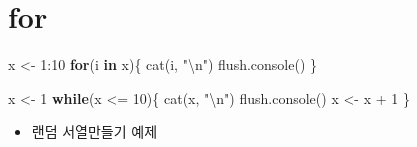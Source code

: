 \documentclass[
]{book}
\newenvironment{Shaded}{\begin{snugshade}}{\end{snugshade}}
\newcommand{\ControlFlowTok}[1]{\textcolor[rgb]{0.13,0.29,0.53}{\textbf{#1}}}
\newcommand{\DecValTok}[1]{\textcolor[rgb]{0.00,0.00,0.81}{#1}}
\newcommand{\FunctionTok}[1]{\textcolor[rgb]{0.00,0.00,0.00}{#1}}
\newcommand{\NormalTok}[1]{#1}
\newcommand{\OtherTok}[1]{\textcolor[rgb]{0.56,0.35,0.01}{#1}}
\newcommand{\SpecialCharTok}[1]{\textcolor[rgb]{0.00,0.00,0.00}{#1}}
\newcommand{\StringTok}[1]{\textcolor[rgb]{0.31,0.60,0.02}{#1}}
\providecommand{\tightlist}{%
  \setlength{\itemsep}{0pt}\setlength{\parskip}{0pt}}
\begin{document}
\hypertarget{for}{%
\section{for}\label{for}}

\begin{Shaded}
\begin{Highlighting}[]
\NormalTok{x }\OtherTok{\textless{}{-}} \DecValTok{1}\SpecialCharTok{:}\DecValTok{10}
\ControlFlowTok{for}\NormalTok{(i }\ControlFlowTok{in}\NormalTok{ x)\{}
  \FunctionTok{cat}\NormalTok{(i, }\StringTok{"}\SpecialCharTok{\textbackslash{}n}\StringTok{"}\NormalTok{)}
  \FunctionTok{flush.console}\NormalTok{()}
\NormalTok{\}}
\end{Highlighting}
\end{Shaded}

\begin{Shaded}
\begin{Highlighting}[]
\NormalTok{x }\OtherTok{\textless{}{-}} \DecValTok{1}
\ControlFlowTok{while}\NormalTok{(x }\SpecialCharTok{\textless{}=} \DecValTok{10}\NormalTok{)\{}
  \FunctionTok{cat}\NormalTok{(x, }\StringTok{"}\SpecialCharTok{\textbackslash{}n}\StringTok{"}\NormalTok{)}
  \FunctionTok{flush.console}\NormalTok{()}
\NormalTok{  x }\OtherTok{\textless{}{-}}\NormalTok{ x }\SpecialCharTok{+} \DecValTok{1}
\NormalTok{\}}
\end{Highlighting}
\end{Shaded}

\begin{itemize}
\tightlist
\item
  랜덤 서열만들기 예제
\end{itemize}
\end{document}
